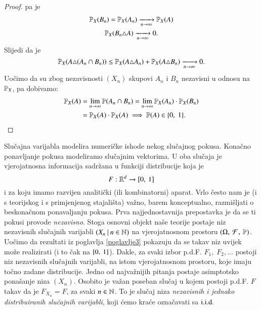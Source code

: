 \begin{proof}
    pa je
    \begin{equation*}
        \begin{gathered}
            \mathbb{P}_X (B_n) = \mathbb{P}_X (A_n) \xrightarrow[n \to \infty]{} \mathbb{P}_X (A)\\
            \mathbb{P}_X (B_n \triangle A) \xrightarrow[n \to \infty]{} 0.
        \end{gathered}
    \end{equation*}
    Slijedi da je
    \begin{equation*}
        \mathbb{P}_X (A \triangle (A_n \cap B_n)) \leq \mathbb{P}_X (A \triangle A_n) + \mathbb{P}_X (A \triangle B_n) \xrightarrow[n \to \infty]{} 0.
    \end{equation*}
    Uo\v cimo da su zbog nezavisnosti $(X_n)$ skupovi $A_n$ i $B_n$ nezavisni u odnosu na $\mathbb{P}_X$, pa dobivamo:
    \begin{equation*}
        \begin{aligned}
            \mathbb{P}_X (A)
            &= \lim\limits_{n \to \infty} \mathbb{P} (A_n \cap B_n) = \lim\limits_{n \to \infty} \mathbb{P}_X (A_n) \cdot \mathbb{P}_X (B_n)\\
            &= \mathbb{P}_X (A) \cdot \mathbb{P}_X(A) \implies \mathbb{P}(A) \in \{0, \; 1\}.
        \end{aligned}
    \end{equation*}
\end{proof}

\begin{nap} \label{nap:9.12}
    Slu\v cajna varijabla modelira numeri\v cke ishode nekog slu\v cajnog pokusa.
    Kona\v cno ponavljanje pokusa modeliramo slu\v cajnim vektorima.
    U oba slu\v caja je vjerojatnosna informacija sadr\v zana u funkciji distribucije koja je
    \begin{equation*}
        F: \mathbb{R}^d \to [{0}, \:{1}]
    \end{equation*}
    i za koju imamo razvijen analiti\v cki (ili kombinatorni) aparat.
    Vrlo \v cesto nam je (i s teorijskog i s primjenjenog stajali\v sta) va\v zno, barem konceptualno, razmi\v sljati o beskona\v cnom ponavaljanju pokusa.
    Prva najjednostavnija prepostavka je da se ti pokusi provode \emph{nezavisno}.
    Stoga osnovni objekt na\v se teorije postaje niz nezavisnih slu\v cajnih varijabli $({X_n} \: | \: {n \in \mathbb{N}})$ na vjerojatnosnom prostoru $(\Omega, \: \mathcal{F}, \: \mathbb{P})$.
    Uo\v cimo da rezultati iz poglavlja \ref{poglavlje3} pokazuju da se takav niz uvijek mo\v ze realizirati (i to \v cak na $[{0}, \:{1}]$).
    Dakle, za svaki izbor p.d.F. $F_1, \; F_2, \ldots$ postoji niz nezavisnih slu\v cajnih varijabli, na istom vjerojatnosnom prostoru, koje imaju to\v cno zadane distribucije.
    Jedno od najva\v znijih pitanja postaje asimptotsko pona\v sanje niza $(X_n)$.
    Osobito je va\v zan poseban slu\v caj u kojem postoji p.d.F. $F$ takav da je $F_{X_n} = F$, za svaki $n \in \mathbb{N}$.
    To je slu\v caj niza \emph{nezavisnih i jednako distribuiranih slu\v cajnih varijabli}, koji \' cemo kra\' ce ozna\v cavati sa $\mathrm{i.i.d.}$
\end{nap}